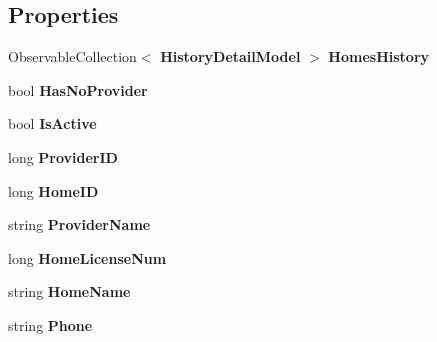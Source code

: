 \subsection*{Properties}
\begin{DoxyCompactItemize}
\item 
\mbox{\label{class_a_f_h___scheduler_1_1_data_1_1_home_model_a7cce9a7067bbfbe258b12ca0ec36ec1b}} 
Observable\+Collection$<$ \textbf{ History\+Detail\+Model} $>$ {\bfseries Homes\+History}\hspace{0.3cm}{\ttfamily  [get, set]}
\item 
\mbox{\label{class_a_f_h___scheduler_1_1_data_1_1_home_model_ac08f8df17b346d0e9552028f3a249d95}} 
bool {\bfseries Has\+No\+Provider}\hspace{0.3cm}{\ttfamily  [get, set]}
\item 
\mbox{\label{class_a_f_h___scheduler_1_1_data_1_1_home_model_a90d33e9e0a21080cf0b565c117c8e986}} 
bool {\bfseries Is\+Active}\hspace{0.3cm}{\ttfamily  [get, set]}
\item 
\mbox{\label{class_a_f_h___scheduler_1_1_data_1_1_home_model_afcaa82ecc13f4c01bd30edffac5c38ab}} 
long {\bfseries Provider\+ID}\hspace{0.3cm}{\ttfamily  [get, set]}
\item 
\mbox{\label{class_a_f_h___scheduler_1_1_data_1_1_home_model_a53299c0b56d108e2543e72f0251b8e72}} 
long {\bfseries Home\+ID}\hspace{0.3cm}{\ttfamily  [get, set]}
\item 
\mbox{\label{class_a_f_h___scheduler_1_1_data_1_1_home_model_a42f90a38a3d25cc5a185bc3aec4d9d10}} 
string {\bfseries Provider\+Name}\hspace{0.3cm}{\ttfamily  [get, set]}
\item 
\mbox{\label{class_a_f_h___scheduler_1_1_data_1_1_home_model_af5f11a359d3a8befe9de1a77ffb41f52}} 
long {\bfseries Home\+License\+Num}\hspace{0.3cm}{\ttfamily  [get, set]}
\item 
\mbox{\label{class_a_f_h___scheduler_1_1_data_1_1_home_model_a5a1582ab158856e68f5e8d2a176b32b5}} 
string {\bfseries Home\+Name}\hspace{0.3cm}{\ttfamily  [get, set]}
\item 
\mbox{\label{class_a_f_h___scheduler_1_1_data_1_1_home_model_a6f9f08520eca4ed5aecceea8ddb55270}} 
string {\bfseries Phone}\hspace{0.3cm}{\ttfamily  [get, set]}
\item 

\end{DoxyCompactItemize}
